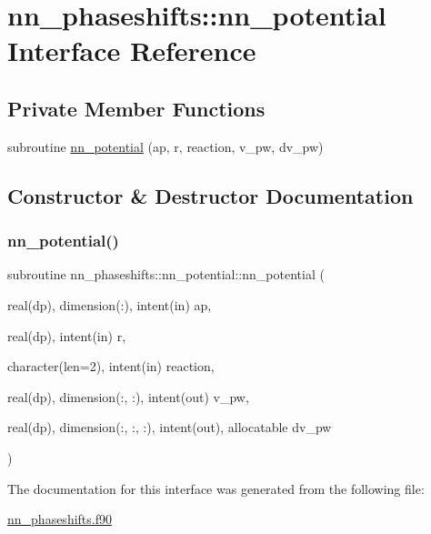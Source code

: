 \hypertarget{interfacenn__phaseshifts_1_1nn__potential}{}\section{nn\+\_\+phaseshifts\+:\+:nn\+\_\+potential Interface Reference}
\label{interfacenn__phaseshifts_1_1nn__potential}
\subsection*{Private Member Functions}
\begin{DoxyCompactItemize}
\item 
subroutine \hyperlink{interfacenn__phaseshifts_1_1nn__potential_a2638546045761d6b02c9f3be36a79242}{nn\+\_\+potential} (ap, r, reaction, v\+\_\+pw, dv\+\_\+pw)
\end{DoxyCompactItemize}


\subsection{Constructor \& Destructor Documentation}
\mbox{\label{interfacenn__phaseshifts_1_1nn__potential_a2638546045761d6b02c9f3be36a79242}} 
\subsubsection{\texorpdfstring{nn\+\_\+potential()}{nn\_potential()}}
{\footnotesize\ttfamily subroutine nn\+\_\+phaseshifts\+::nn\+\_\+potential\+::nn\+\_\+potential (\begin{DoxyParamCaption}\item[{real(dp), dimension(\+:), intent(in)}]{ap,  }\item[{real(dp), intent(in)}]{r,  }\item[{character(len=2), intent(in)}]{reaction,  }\item[{real(dp), dimension(\+:, \+:), intent(out)}]{v\+\_\+pw,  }\item[{real(dp), dimension(\+:, \+:, \+:), intent(out), allocatable}]{dv\+\_\+pw }\end{DoxyParamCaption})\hspace{0.3cm}{\ttfamily [private]}}



The documentation for this interface was generated from the following file\+:\begin{DoxyCompactItemize}
\item 
\hyperlink{nn__phaseshifts_8f90}{nn\+\_\+phaseshifts.\+f90}\end{DoxyCompactItemize}
